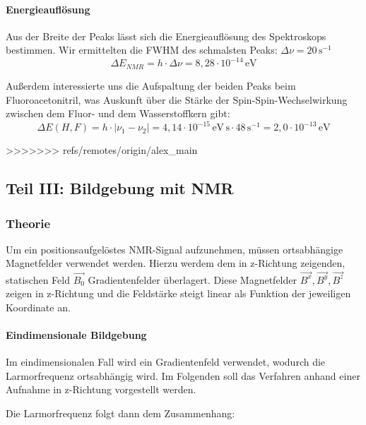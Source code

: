 \documentclass[a4paper]{scrartcl} %
\begin{document}
\paragraph{Energieauflösung}

Aus der Breite der Peaks lässt sich die Energieauflösung des Spektroskops bestimmen. Wir ermittelten die FWHM des schmalsten Peaks: $\Delta \nu = 20\, \mathrm{s^{-1}}$
\begin{equation}
	\Delta E_{NMR} = h \cdot \Delta \nu = 8,28 \cdot 10^{-14} \, \mathrm{eV}
\end{equation}

Außerdem interessierte uns die Aufspaltung der beiden Peaks beim Fluoroacetonitril, was Auskunft über die Stärke der Spin-Spin-Wechselwirkung zwischen dem Fluor- und dem Wasserstoffkern gibt:
\begin{equation}
	\Delta E(H, F) = h \cdot | \nu_1 - \nu_2 | = 4,14 \cdot 10^{-15} \, \mathrm{eV\,s} \cdot 48 \, \mathrm{s^{-1}} = 2,0 \cdot 10^{-13} \, \mathrm{eV}
\end{equation}

>>>>>>> refs/remotes/origin/alex_main
\newpage

\subsection{Teil III: Bildgebung mit NMR}

\subsubsection{Theorie}

Um ein positionsaufgelöstes NMR-Signal aufzunehmen, müssen ortsabhängige Magnetfelder verwendet werden. Hierzu werdem dem in z-Richtung zeigenden, statischen Feld $\vec{B_0}$ Gradientenfelder überlagert. Diese Magnetfelder $\vec{B^x}, \vec{B^y}, \vec{B^z}$ zeigen in z-Richtung und die Feldstärke steigt linear als Funktion der jeweiligen Koordinate an.

\paragraph{Eindimensionale Bildgebung}

Im eindimensionalen Fall wird ein Gradientenfeld verwendet, wodurch die Larmorfrequenz ortsabhängig wird. Im Folgenden soll das Verfahren anhand einer Aufnahme in z-Richtung vorgestellt werden.

Die Larmorfrequenz folgt dann dem Zusammenhang:
\end{document}
